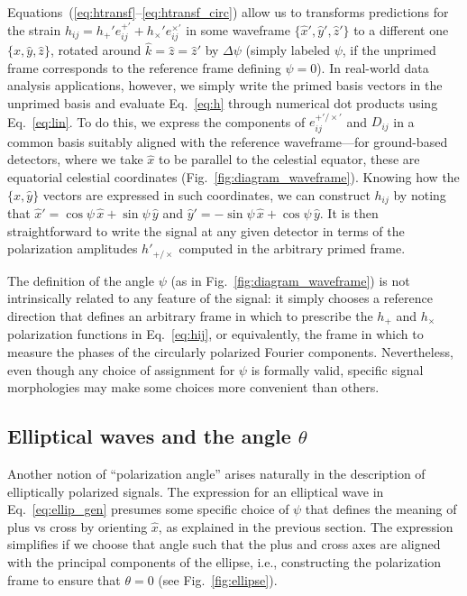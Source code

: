 \documentclass[aps,prd,twocolumn,superscriptaddress,preprintnumbers,floatfix,nofootinbib]{revtex4-2}
\newcommand*{\eq}[1]{Eq.~\eqref{eq:#1}}
\begin{document}
Equations~(\ref{eq:htransf}--\ref{eq:htransf_circ}) allow us to transforms predictions for the strain $h_{ij} = h_+' e^{+'}_{ij} + h_{\times}' e^{\times'}_{ij}$ in some waveframe $\{\hat{x}', \hat{y}', \hat{z}'\}$ to a different one $\{\hat{x}, \hat{y}, \hat{z}\}$, rotated around $\hat{k}=\hat{z}=\hat{z}'$ by $\Delta \psi$ (simply labeled $\psi$, if the unprimed frame corresponds to the reference frame defining $\psi=0$).
In real-world data analysis applications, however, we simply write the primed basis vectors in the unprimed basis and evaluate \eq{h} through numerical dot products using \eq{lin}.
To do this, we express the components of $e^{+'/\times'}_{ij}$ and $D_{ij}$ in a common basis suitably aligned with the reference waveframe---for ground-based detectors, where we take $\hat{x}$ to be parallel to the celestial equator, these are equatorial celestial coordinates (Fig.~\ref{fig:diagram_waveframe}).
Knowing how the $\{\hat{x}, \hat{y}\}$ vectors are expressed in such coordinates, we can construct $h_{ij}$ by noting that $\hat{x}' = \cos\psi\, \hat{x} + \sin\psi\, \hat{y}$ and $\hat{y}'= - \sin\psi\, \hat{x} + \cos\psi\, \hat{y}$.
It is then straightforward to write the signal at any given detector in terms of the polarization amplitudes $h'_{+/\times}$ computed in the arbitrary primed frame.

The definition of the angle $\psi$ (as in Fig.~\ref{fig:diagram_waveframe}) is not intrinsically related to any feature of the signal: it simply chooses a reference direction that defines an arbitrary frame in which to prescribe the $h_+$ and $h_\times$ polarization functions in \eq{hij}, or equivalently, the frame in which to measure the phases of the circularly polarized Fourier components.
Nevertheless, even though any choice of assignment for $\psi$ is formally valid, specific signal morphologies may make some choices more convenient than others.

\subsection{Elliptical waves and the angle $\theta$}
\label{sec:ellip}

Another notion of ``polarization angle'' arises naturally in the description of elliptically polarized signals.
The expression for an elliptical wave in \eq{ellip_gen} presumes some specific choice of $\psi$ that defines the meaning of plus vs cross by orienting $\hat{x}$, as explained in the previous section.
The expression simplifies if we choose that angle such that the plus and cross axes are aligned with the principal components of the ellipse, i.e., constructing the polarization frame to ensure that $\theta = 0$ (see Fig.~\ref{fig:ellipse}).
\end{document}
